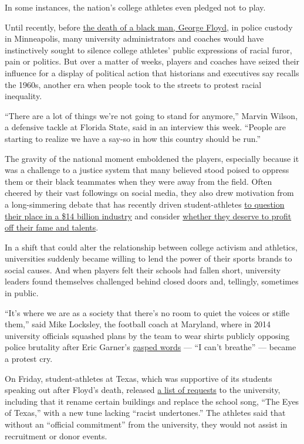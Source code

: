 In some instances, the nation's college athletes even pledged not to
play.

Until recently, before
\href{https://www.nytimes.com/news-event/george-floyd-protests-minneapolis-new-york-los-angeles}{the
death of a black man, George Floyd}, in police custody in Minneapolis,
many university administrators and coaches would have instinctively
sought to silence college athletes' public expressions of racial furor,
pain or politics. But over a matter of weeks, players and coaches have
seized their influence for a display of political action that historians
and executives say recalls the 1960s, another era when people took to
the streets to protest racial inequality.

``There are a lot of things we're not going to stand for anymore,''
Marvin Wilson, a defensive tackle at Florida State, said in an interview
this week. ``People are starting to realize we have a say-so in how this
country should be run.''

The gravity of the national moment emboldened the players, especially
because it was a challenge to a justice system that many believed stood
poised to oppress them or their black teammates when they were away from
the field. Often cheered by their vast followings on social media, they
also drew motivation from a long-simmering debate that has recently
driven student-athletes
\href{https://www.murphy.senate.gov/download/madness-inc}{to question
their place in a \$14 billion industry} and consider
\href{https://www.nytimes.com/2020/04/29/sports/ncaabasketball/ncaa-athlete-endorsements.html}{whether
they deserve to profit off their fame and talents}.

In a shift that could alter the relationship between college activism
and athletics, universities suddenly became willing to lend the power of
their sports brands to social causes. And when players felt their
schools had fallen short, university leaders found themselves challenged
behind closed doors and, tellingly, sometimes in public.

``It's where we are as a society that there's no room to quiet the
voices or stifle them,'' said Mike Locksley, the football coach at
Maryland, where in 2014 university officials squashed plans by the team
to wear shirts publicly opposing police brutality after Eric Garner's
\href{https://www.nytimes.com/2019/05/12/nyregion/eric-garner-death-daniel-pantaleo-chokehold.html}{gasped
words} --- ``I can't breathe'' --- became a protest cry.

On Friday, student-athletes at Texas, which was supportive of its
students speaking out after Floyd's death, released
\href{https://twitter.com/_BrennanEagles_/status/1271518098248667139}{a
list of requests} to the university, including that it rename certain
buildings and replace the school song, ``The Eyes of Texas,'' with a new
tune lacking ``racist undertones.'' The athletes said that without an
``official commitment'' from the university, they would not assist in
recruitment or donor events.

